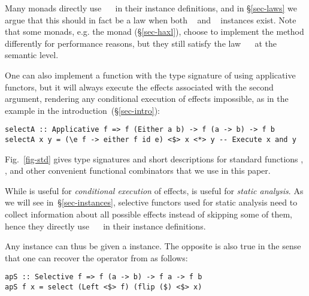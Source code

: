 \noindent
Many monads directly use ~\hs{=}~ in their 
instance definitions, and in \S\ref{sec-laws} we argue that this should in fact
be a law when both ~ and ~ instances exist.
Note that some monads, e.g. the \Haxl monad (\S\ref{sec-haxl}), choose to
implement the   method differently for performance reasons, but they
still satisfy the law ~\hs{=}~ at the semantic level.

One can also implement a function with the type signature of  using
applicative functors, but it will always execute the effects associated with the
second argument, rendering any conditional execution of effects impossible, as
in the  example in the introduction~(\S\ref{sec-intro}):

\vspace{0.5mm}
\begin{verbatim}
selectA :: Applicative f => f (Either a b) -> f (a -> b) -> f b
selectA x y = (\e f -> either f id e) <$> x <*> y -- Execute x and y
\end{verbatim}
\vspace{0.5mm}

\noindent
Fig.~\ref{fig-std} gives type signatures and short descriptions for standard
functions , , and other convenient functional combinators that
we use in this paper.

While  is useful for \emph{conditional execution} of effects,
 is useful for \emph{static analysis}. As we will see
in~\S\ref{sec-instances}, selective functors used for static analysis need to
collect information about all possible effects instead of skipping some of them,
hence they directly use ~\hs{=}~ in their 
instance definitions.

Any  instance can thus be given a  instance. The
opposite is also true in the sense that one can recover the operator \hs{<*>}
from  as follows:

\vspace{0.5mm}
\begin{verbatim}
apS :: Selective f => f (a -> b) -> f a -> f b
apS f x = select (Left <$> f) (flip ($) <$> x)
\end{verbatim}
\vspace{0.5mm}

